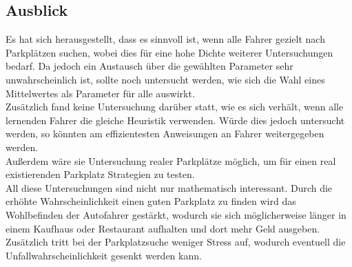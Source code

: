  \subsection{Ausblick}

Es hat sich herausgestellt, dass es sinnvoll ist, wenn alle Fahrer gezielt nach Parkplätzen suchen, wobei dies für eine hohe Dichte weiterer Untersuchungen bedarf. Da jedoch ein Austausch über die gewählten Parameter sehr unwahrscheinlich ist, sollte noch untersucht werden, wie sich die Wahl eines Mittelwertes als Parameter für alle auswirkt.\\
Zusätzlich fand keine Untersuchung darüber statt, wie es sich verhält, wenn alle lernenden Fahrer die gleiche Heuristik verwenden. Würde dies jedoch untersucht werden, so könnten am effizientesten Anweisungen an Fahrer weitergegeben werden. \\
Außerdem wäre sie Untersuchung realer Parkplätze möglich, um für einen real existierenden Parkplatz Strategien zu testen.\\
All diese Untersuchungen sind nicht nur mathematisch interessant. Durch die erhöhte Wahrscheinlichkeit einen guten Parkplatz zu finden wird das Wohlbefinden der Autofahrer gestärkt, wodurch sie sich möglicherweise länger in einem Kaufhaus oder Restaurant aufhalten und dort mehr Geld ausgeben. Zusätzlich tritt bei der Parkplatzsuche weniger Stress auf, wodurch eventuell die Unfallwahrscheinlichkeit gesenkt werden kann.